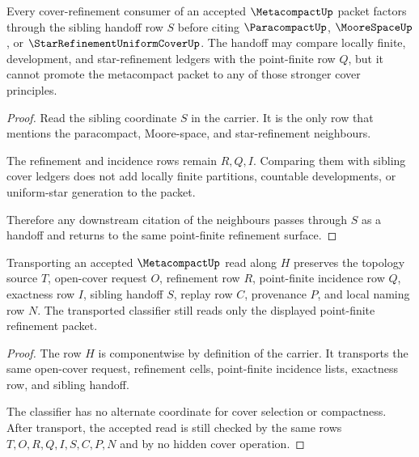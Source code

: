 \begin{theorem}
\label{thm:metacompact-sibling-cover-handoff}
Every cover-refinement consumer of an accepted $\MetacompactUp$ packet factors through the sibling handoff row $S$ before citing $\ParacompactUp$, $\MooreSpaceUp$, or $\StarRefinementUniformCoverUp$. The handoff may compare locally finite, development, and star-refinement ledgers with the point-finite row $Q$, but it cannot promote the metacompact packet to any of those stronger cover principles.
\end{theorem}
\begin{proof}
Read the sibling coordinate $S$ in the carrier. It is the only row that mentions the paracompact, Moore-space, and star-refinement neighbours.

The refinement and incidence rows remain $R,Q,I$. Comparing them with sibling cover ledgers does not add locally finite partitions, countable developments, or uniform-star generation to the packet.

Therefore any downstream citation of the neighbours passes through $S$ as a handoff and returns to the same point-finite refinement surface.
\end{proof}

\begin{theorem}
\label{thm:metacompact-transport-stability}
Transporting an accepted $\MetacompactUp$ read along $H$ preserves the topology source $T$, open-cover request $O$, refinement row $R$, point-finite incidence row $Q$, exactness row $I$, sibling handoff $S$, replay row $C$, provenance $P$, and local naming row $N$. The transported classifier still reads only the displayed point-finite refinement packet.
\end{theorem}
\begin{proof}
The row $H$ is componentwise by definition of the carrier. It transports the same open-cover request, refinement cells, point-finite incidence lists, exactness row, and sibling handoff.

The classifier has no alternate coordinate for cover selection or compactness. After transport, the accepted read is still checked by the same rows $T,O,R,Q,I,S,C,P,N$ and by no hidden cover operation.
\end{proof}

